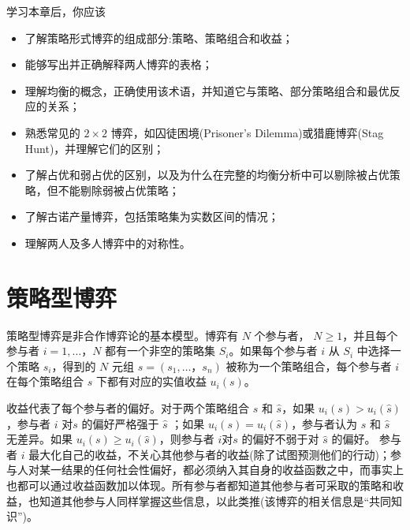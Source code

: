 学习本章后，你应该
\begin{itemize}
\item 了解策略形式博弈的组成部分:策略、策略组合和收益；

\item 能够写出并正确解释两人博弈的表格；

\item 理解均衡的概念，正确使用该术语，并知道它与策略、部分策略组合和最优反应的关系；

\item 熟悉常见的 \(2 \times  2\) 博弈，如囚徒困境(Prisoner’s Dilemma)或猎鹿博弈(Stag Hunt)，并理解它们的区别；

\item 了解占优和弱占优的区别，以及为什么在完整的均衡分析中可以剔除被占优策略，但不能剔除弱被占优策略；

\item 了解古诺产量博弈，包括策略集为实数区间的情况；

\item 理解两人及多人博弈中的对称性。
\end{itemize}

\section{策略型博弈}

策略型博弈是非合作博弈论的基本模型。博弈有 \(N\) 个参与者， \(N \geq  1\)，并且每个参与者 \(i = 1,\ldots，N\) 都有一个非空的策略集 \({S}_{i}\)。如果每个参与者 \(i\) 从 \({S}_{i}\) 中选择一个策略 \({s}_{i}\)，得到的 \(N\) 元组 \(s = \left( {{s}_{1},\ldots，{s}_{n}}\right)\) 被称为一个策略组合，每个参与者 \(i\) 在每个策略组合 \(s\) 下都有对应的实值收益 \({u}_{i}\left( s\right)\)。  

收益代表了每个参与者的偏好。对于两个策略组合 \(s\) 和 \(\widehat{s}\)，如果 \({u}_{i}\left( s\right)  > {u}_{i}\left( \widehat{s}\right)\)，参与者 \(i\) 对\(s\) 的偏好严格强于 \(\widehat{s}\) ；如果 \({u}_{i}\left( s\right)  = {u}_{i}\left( \widehat{s}\right)\)，参与者认为 \(s\) 和 \(\widehat{s}\) 无差异。如果 \({u}_{i}\left( s\right)  \geq  {u}_{i}\left( \widehat{s}\right)\)，则参与者 \(i\)对\(s\) 的偏好不弱于对 \(\widehat{s}\) 的偏好。 参与者 \(i\) 最大化自己的收益，不关心其他参与者的收益(除了试图预测他们的行动)；参与人对某一结果的任何社会性偏好，都必须纳入其自身的收益函数之中，而事实上也都可以通过收益函数加以体现。所有参与者都知道其他参与者可采取的策略和收益，也知道其他参与人同样掌握这些信息，以此类推(该博弈的相关信息是“共同知识”)。

